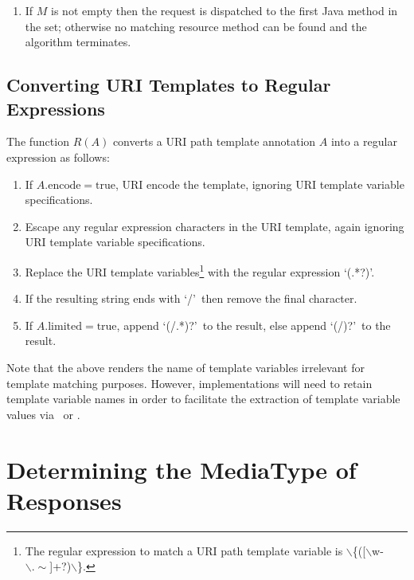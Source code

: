 \begin{enumerate}
\begin{enumerate}
Sorting of media types follows the general rule: x/y $<$ x/* $<$ */*, i.e. a method that explicitly lists one of the requested media types is sorted before a method that lists */*. Quality parameter values are also used such that x/y;q=1.0 $<$ x/y;q=0.7. See section 14.1 of \cite{http11} for more details.

\item \label{dispatch_method} If $M$ is not empty then the request is dispatched to the first Java method in the set; otherwise no matching resource method can be found and the algorithm terminates.
\end{enumerate}

\end{enumerate}

\subsection{Converting URI Templates to Regular Expressions}
\label{template_to_regex}

The function $R(A)$ converts a URI path template annotation $A$ into a regular expression as follows:
\begin{enumerate}
\item If $A.\mbox{encode}=\mbox{true}$, URI encode the template, ignoring URI template variable specifications.
\item Escape any regular expression characters in the URI template, again ignoring URI template variable specifications.
\item Replace the URI template variables\footnote{The regular expression to match a URI path template variable is $\backslash$\{([$\backslash$w-$\backslash.\sim$]+?)$\backslash$\}.} with the regular expression \lq(.*?)\rq.
\item If the resulting string ends with \lq/\rq\ then remove the final character.
\item If $A.\mbox{limited}=\mbox{true}$, append \lq(/.*)?\rq\ to the result, else append \lq(/)?\rq\ to the result.
\end{enumerate}

Note that the above renders the name of template variables irrelevant for template matching purposes. However, implementations will need to retain template variable names in order to facilitate the extraction of template variable values via \PathParam\ or \UriInfo{}.

\section{Determining the MediaType of Responses}


